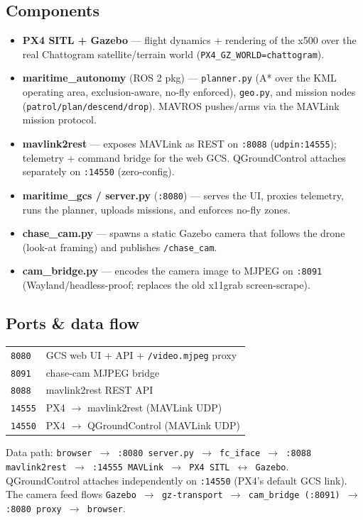 \documentclass[11pt]{article}
\begin{document}
\subsection{Components}
\begin{itemize}\setlength\itemsep{1pt}
  \item \textbf{PX4 SITL + Gazebo} --- flight dynamics + rendering of the x500 over
        the real Chattogram satellite/terrain world (\texttt{PX4\_GZ\_WORLD=chattogram}).
  \item \textbf{maritime\_autonomy} (ROS 2 pkg) --- \texttt{planner.py} (A* over the KML
        operating area, exclusion-aware, no-fly enforced), \texttt{geo.py}, and mission
        nodes (\texttt{patrol/plan/descend/drop}). MAVROS pushes/arms via the MAVLink
        mission protocol.
  \item \textbf{mavlink2rest} --- exposes MAVLink as REST on \texttt{:8088}
        (\texttt{udpin:14555}); telemetry + command bridge for the web GCS.
        QGroundControl attaches separately on \texttt{:14550} (zero-config).
  \item \textbf{maritime\_gcs / server.py} (\texttt{:8080}) --- serves the UI, proxies
        telemetry, runs the planner, uploads missions, and enforces no-fly zones.
  \item \textbf{chase\_cam.py} --- spawns a static Gazebo camera that follows the drone
        (look-at framing) and publishes \texttt{/chase\_cam}.
  \item \textbf{cam\_bridge.py} --- encodes the camera image to MJPEG on \texttt{:8091}
        (Wayland/headless-proof; replaces the old x11grab screen-scrape).
\end{itemize}

\subsection{Ports \& data flow}
\begin{center}
\begin{tabular}{@{}ll@{}}
\toprule
\texttt{8080} & GCS web UI + API + \texttt{/video.mjpeg} proxy \\
\texttt{8091} & chase-cam MJPEG bridge \\
\texttt{8088} & mavlink2rest REST API \\
\texttt{14555}& PX4 $\rightarrow$ mavlink2rest (MAVLink UDP) \\
\texttt{14550}& PX4 $\rightarrow$ QGroundControl (MAVLink UDP) \\
\bottomrule
\end{tabular}
\end{center}
Data path: \texttt{browser $\to$ :8080 server.py $\to$ fc\_iface $\to$ :8088 mavlink2rest
$\to$ :14555 MAVLink $\to$ PX4 SITL $\leftrightarrow$ Gazebo}. QGroundControl attaches
independently on \texttt{:14550} (PX4's default GCS link). The camera feed flows
\texttt{Gazebo $\to$ gz-transport $\to$ cam\_bridge (:8091) $\to$ :8080 proxy $\to$ browser}.
\end{document}
